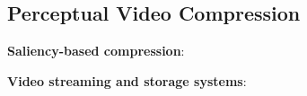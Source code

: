 \subsection{Perceptual Video Compression}
\label{sec:vignette-related}

\noindent \textbf{Saliency-based compression}: 

\noindent\textbf{Video streaming and storage systems}: 

